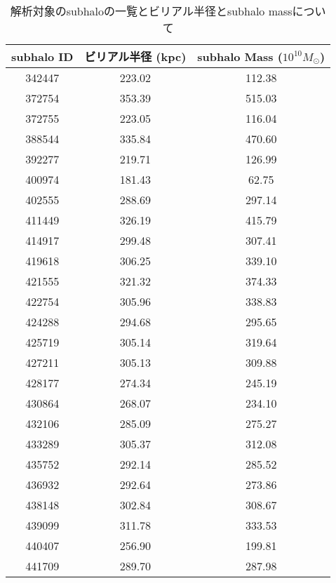 \documentclass[main.tex]{subfiles}
\begin{document}
	\begin{longtable}{ccc}
		
		\caption{解析対象のsubhaloの一覧とビリアル半径とsubhalo massについて} \label{tab:virialtable} \\
		\toprule
		subhalo ID & ビリアル半径 (\si{kpc}) & subhalo Mass ($10^{10} M_\odot$)\\
		\midrule
		\endhead
		
		\bottomrule
		\endfoot
		
		342447     & 223.02       & 112.38       \\
		372754     & 353.39       & 515.03       \\
		372755     & 223.05       & 116.04       \\
		388544     & 335.84       & 470.60       \\
		392277     & 219.71       & 126.99       \\
		400974     & 181.43       & 62.75        \\
		402555     & 288.69       & 297.14       \\
		411449     & 326.19       & 415.79       \\
		414917     & 299.48       & 307.41       \\
		419618     & 306.25       & 339.10       \\
		421555     & 321.32       & 374.33       \\
		422754     & 305.96       & 338.83       \\
		424288     & 294.68       & 295.65       \\
		425719     & 305.14       & 319.64       \\
		427211     & 305.13       & 309.88       \\
		428177     & 274.34       & 245.19       \\
		430864     & 268.07       & 234.10       \\
		432106     & 285.09       & 275.27       \\
		433289     & 305.37       & 312.08       \\
		435752     & 292.14       & 285.52       \\
		436932     & 292.64       & 273.86       \\
		438148     & 302.84       & 308.67       \\
		439099     & 311.78       & 333.53       \\
		440407     & 256.90       & 199.81       \\
		441709     & 289.70       & 287.98       \\

\end{longtable}
\end{document}
